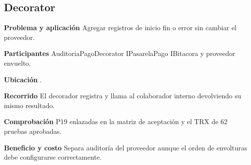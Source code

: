 \noindent\begin{minipage}{\linewidth}
\subsection{Decorator}
\textbf{Problema y aplicación} Agregar registros de inicio fin o error sin cambiar el proveedor.

\textbf{Participantes} AuditoriaPagoDecorator IPasarelaPago IBitacora y proveedor envuelto.

\textbf{Ubicación} \href{https://github.com/Alan77-bot/LogiMarket360Alan/blob/68bda51063441415524ede51bdf61649ee9b4973/LogiMarket.Infrastructure/Pagos/AuditoriaPagoDecorator.cs#L11}{}.

\textbf{Recorrido} El decorador registra y llama al colaborador interno devolviendo su mismo resultado.


\textbf{Comprobación} P19 enlazadas en la matriz de aceptación y el TRX de 62 pruebas aprobadas.

\textbf{Beneficio y costo} Separa auditoría del proveedor aunque el orden de envolturas debe configurarse correctamente.

\end{minipage}\par\smallskip
